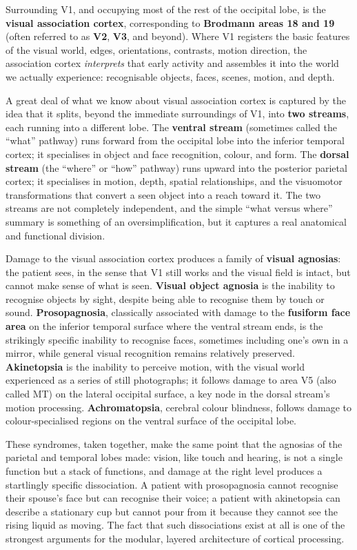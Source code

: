\documentclass[11pt]{article}
\begin{document}
Surrounding V1, and occupying most of the rest of the occipital lobe, is the \textbf{visual association cortex}, corresponding to \textbf{Brodmann areas 18 and 19} (often referred to as \textbf{V2}, \textbf{V3}, and beyond). Where V1 registers the basic features of the visual world, edges, orientations, contrasts, motion direction, the association cortex \textit{interprets} that early activity and assembles it into the world we actually experience: recognisable objects, faces, scenes, motion, and depth.

A great deal of what we know about visual association cortex is captured by the idea that it splits, beyond the immediate surroundings of V1, into \textbf{two streams}, each running into a different lobe. The \textbf{ventral stream} (sometimes called the ``what'' pathway) runs forward from the occipital lobe into the inferior temporal cortex; it specialises in object and face recognition, colour, and form. The \textbf{dorsal stream} (the ``where'' or ``how'' pathway) runs upward into the posterior parietal cortex; it specialises in motion, depth, spatial relationships, and the visuomotor transformations that convert a seen object into a reach toward it. The two streams are not completely independent, and the simple ``what versus where'' summary is something of an oversimplification, but it captures a real anatomical and functional division.

Damage to the visual association cortex produces a family of \textbf{visual agnosias}: the patient sees, in the sense that V1 still works and the visual field is intact, but cannot make sense of what is seen. \textbf{Visual object agnosia} is the inability to recognise objects by sight, despite being able to recognise them by touch or sound. \textbf{Prosopagnosia}, classically associated with damage to the \textbf{fusiform face area} on the inferior temporal surface where the ventral stream ends, is the strikingly specific inability to recognise faces, sometimes including one's own in a mirror, while general visual recognition remains relatively preserved. \textbf{Akinetopsia} is the inability to perceive motion, with the visual world experienced as a series of still photographs; it follows damage to area V5 (also called MT) on the lateral occipital surface, a key node in the dorsal stream's motion processing. \textbf{Achromatopsia}, cerebral colour blindness, follows damage to colour-specialised regions on the ventral surface of the occipital lobe.

These syndromes, taken together, make the same point that the agnosias of the parietal and temporal lobes made: vision, like touch and hearing, is not a single function but a stack of functions, and damage at the right level produces a startlingly specific dissociation. A patient with prosopagnosia cannot recognise their spouse's face but can recognise their voice; a patient with akinetopsia can describe a stationary cup but cannot pour from it because they cannot see the rising liquid as moving. The fact that such dissociations exist at all is one of the strongest arguments for the modular, layered architecture of cortical processing.
\end{document}
